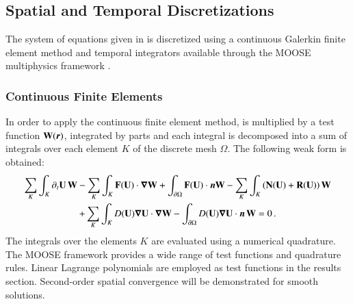 \documentclass[preprint,10pt]{elsarticle}
\begin{document}
\subsection{Spatial and Temporal Discretizations} \label{sec:spatial-disc}
%
The system of equations given in  is discretized using a continuous Galerkin finite element 
method and temporal integrators available through the MOOSE multiphysics framework \cite{Moose}.
%
\subsubsection{Continuous Finite Elements} 
%
In order to apply the continuous finite element method,  is multiplied by a test function 
$\mathbf W(\boldsymbol r)$, integrated by parts and each integral is decomposed into a sum of integrals over 
each element $K$ of the discrete mesh $\Omega$. The following weak form is obtained:
%
\begin{multline}\label{eq:cfem}
\sum_K \int_{K} \partial_t \mathbf U \, \mathbf W - \sum_K \int_{K} \mathbf F (\mathbf U) \cdot \boldsymbol\nabla \mathbf W + \int_{\partial \Omega} \mathbf F (\mathbf U) 
\cdot \boldsymbol n \mathbf W - \sum_K \int_{K} \left( \mathbf N (\mathbf U) + \mathbf R (\mathbf U) \right) \mathbf W  \\
+ \sum_K \int_{K} D(\mathbf U) \boldsymbol\nabla \mathbf U \cdot \boldsymbol\nabla \mathbf W 
- \int_{\partial \Omega} D(\mathbf U) \boldsymbol\nabla \mathbf U \cdot \boldsymbol n \, \mathbf W = 0 \,.
\end{multline}
%
The integrals over the elements $K$ are evaluated using a numerical quadrature. The MOOSE framework 
provides a wide range of test functions and quadrature rules. Linear Lagrange polynomials are employed 
as test functions in the results section. Second-order spatial convergence will be demonstrated for smooth solutions. 
%
\end{document}

